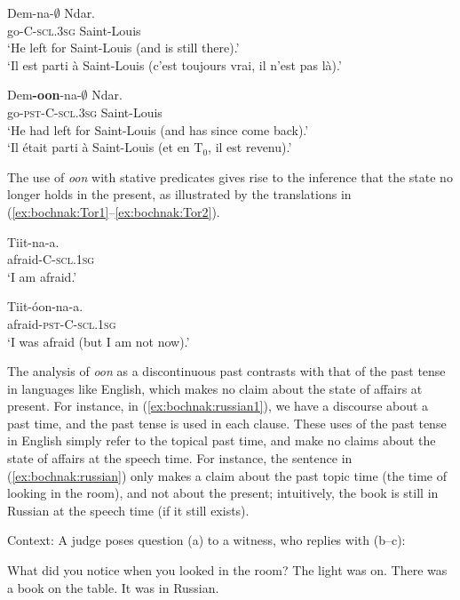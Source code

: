 \documentclass[output=paper,newtxmath,modfonts,nonflat,draftmode]{langsci/langscibook}
\begin{document}
\ea
\gll Dem-na-$\emptyset$ Ndar.\\
go-C-\textsc{scl.3sg} Saint-Louis\\
\glt `He left for Saint-Louis (and is still there).'\\
`Il est parti \`a Saint-Louis (c'est toujours vrai, il n'est
  pas l\`a).' \hfill \citep[279]{robert91approche}\label{ex:bochnak:Robert1}
\z

\ea
\gll Dem\textbf{-oon}-na-$\emptyset$ Ndar.\\
go-\textsc{pst}-C-\textsc{scl.3sg} Saint-Louis\\
\glt `He had left for Saint-Louis (and has since come
  back).'\\`Il \'etait parti \`a Saint-Louis (et en T$_0$,
  il est revenu).' \hfill \citep[279]{robert91approche}\label{ex:bochnak:Robert2}
\z


The use of \textit{oon} with stative predicates gives rise to the inference that the state no longer holds in the present, as illustrated by the translations in (\ref{ex:bochnak:Tor1}--\ref{ex:bochnak:Tor2}).

\ea
\gll Tiit-na-a.\\
afraid-C-\textsc{scl.1sg}\\
\glt `I am afraid.'\hfill\citep[25]{torrence12clause}\label{ex:bochnak:Tor1}
\z

\ea
\gll Tiit-\'oon-na-a.\\
afraid-\textsc{pst}-C-\textsc{scl.1sg}\\
\glt `I was afraid (but I am not now).'\hfill\citep[26]{torrence12clause}\label{ex:bochnak:Tor2}
\z

The analysis of \textit{oon} as a discontinuous past contrasts with that of the past tense in languages like English, which makes no claim about the state of affairs at present. For instance, in (\ref{ex:bochnak:russian1}), we have a discourse about a past time, and the past tense is used in each clause. These uses of the past tense in English simply refer to the topical past time, and make no claims about the state of affairs at the speech time. For instance, the sentence in (\ref{ex:bochnak:russian}) only makes a claim about the past topic time (the time of looking in the room), and not about the present; intuitively, the book is still in Russian at the speech time (if it still exists).

\begin{exe}
\ex\label{ex:bochnak:russian1} Context: A judge poses question (a) to a witness, who replies with (b--c):
\begin{xlist}
\ex What did you notice when you looked in the room?
\ex The light was on. There was a book on the table.
\ex\label{ex:bochnak:russian} It was in Russian. \hfill \citep{klein94time}
\end{xlist}
\end{exe}
\end{document}
